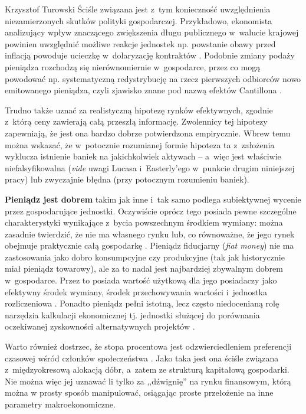 \begin{artplenv}{Krzysztof Turowski}
Ściśle związana jest z~tym konieczność uwzględnienia niezamierzonych skutków polityki gospodarczej. Przykładowo,
ekonomista analizujący wpływ znaczącego zwiększenia długu publicznego w~walucie krajowej powinien uwzględnić możliwe
reakcje jednostek np. powstanie obawy przed inflacją powoduje ucieczkę w~dolaryzację kontraktów
\parencite{palley_money_2015}.
Podobnie zmiany podaży pieniądza rozchodzą się nierównomiernie w~gospodarce,
przez co mogą powodować np. systematyczną redystrybucję na rzecz pierwszych odbiorców nowo emitowanego
pieniądza, czyli zjawisko znane pod nazwą efektów Cantillona
\parencite{sieron_efekt_2017}.

Trudno także uznać za realistyczną hipotezę rynków efektywnych, zgodnie z~którą ceny zawierają całą przeszłą
informację.
Zwolennicy tej hipotezy zapewniają, że jest ona bardzo dobrze potwierdzona empirycznie.
Wbrew temu można wskazać, że
w~potocznie rozumianej formie hipoteza ta z~założenia wyklucza istnienie baniek na jakichkolwiek aktywach  --  a~więc
jest właściwie niefalsyfikowalna (\textit{vide} uwagi Lucasa i~Easterly’ego w~punkcie drugim niniejszej pracy) lub zwyczajnie
błędna (przy potocznym rozumieniu baniek).

\textbf{Pieniądz jest dobrem} takim jak inne i~tak samo podlega subiektywnej wycenie przez gospodarujące jednostki.
Oczywiście oprócz tego posiada pewne szczególne charakterystyki wynikające z~bycia powszechnym środkiem wymiany: można
zasadnie twierdzić, że nie ma własnego rynku lub, co równoważne, że jego rynek obejmuje praktycznie całą gospodarkę
\parencite{horwitz_microfoundations_2000}.
Pieniądz fiducjarny (\textit{fiat money}) nie ma zastosowania jako dobro
konsumpcyjne czy produkcyjne (tak jak historycznie miał pieniądz towarowy), ale za to nadal jest najbardziej zbywalnym
dobrem w~gospodarce. Przez to posiada wartość użytkową dla jego posiadaczy jako efektywny środek wymiany, środek
przechowywania wartości i~jednostka rozliczeniowa
\parencite{jevons_money_1876}.
Ponadto pieniądz pełni
istotną, lecz często niedocenianą rolę narzędzia kalkulacji ekonomicznej tj. jednostki służącej do porównania
oczekiwanej zyskowności alternatywnych projektów
\parencite{mises_kalkulacja_2011}.

Warto również dostrzec, że stopa procentowa jest odzwierciedleniem preferencji czasowej wśród członków społeczeństwa
\parencite{rothbard_man_1962}.
Jako taka jest ona ściśle związana z~międzyokresową alokacją dóbr, a~zatem
ze strukturą kapitałową gospodarki. Nie można więc jej uznawać li tylko za ,,dźwignię'' na rynku finansowym, którą można
w prosty sposób manipulować, osiągając proste przełożenie na inne parametry makroekonomiczne.


\end{artplenv}
